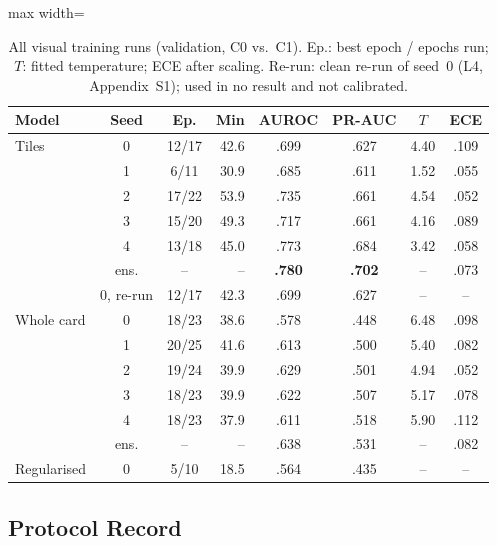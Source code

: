 \documentclass[12pt]{article}
\begin{document}
\begin{table}[H]
\caption{All visual training runs (validation, C0 vs.\ C1). Ep.: best
epoch / epochs run; $T$: fitted temperature; ECE after scaling.
Re-run: clean re-run of seed~0 (L4, Appendix~S1); used in no
result and not calibrated.}
\label{tab:runs}
\centering
\scriptsize
\setlength{\tabcolsep}{2.6pt}
\renewcommand{\arraystretch}{1.08}
\begin{adjustbox}{max width=\linewidth}
\begin{tabular}{@{}l c c r c c c c@{}}
\toprule
Model & Seed & Ep. & Min & AUROC & PR-AUC & $T$ & ECE \\
\midrule
Tiles & 0 & 12/17 & 42.6 & .699 & .627 & 4.40 & .109 \\
      & 1 & \hphantom{0}6/11 & 30.9 & .685 & .611 & 1.52 & .055 \\
      & 2 & 17/22 & 53.9 & .735 & .661 & 4.54 & .052 \\
      & 3 & 15/20 & 49.3 & .717 & .661 & 4.16 & .089 \\
      & 4 & 13/18 & 45.0 & .773 & .684 & 3.42 & .058 \\
      & ens. & -- & -- & \textbf{.780} & \textbf{.702} & -- & .073 \\
      & 0, re-run & 12/17 & 42.3 & .699 & .627 & -- & -- \\
\addlinespace[4pt]
Whole card & 0 & 18/23 & 38.6 & .578 & .448 & 6.48 & .098 \\
           & 1 & 20/25 & 41.6 & .613 & .500 & 5.40 & .082 \\
           & 2 & 19/24 & 39.9 & .629 & .501 & 4.94 & .052 \\
           & 3 & 18/23 & 39.9 & .622 & .507 & 5.17 & .078 \\
           & 4 & 18/23 & 37.9 & .611 & .518 & 5.90 & .112 \\
           & ens. & -- & -- & .638 & .531 & -- & .082 \\
\addlinespace[4pt]
Regularised & 0 & \hphantom{0}5/10 & 18.5 & .564 & .435 & -- & -- \\
\bottomrule
\end{tabular}
\end{adjustbox}
\end{table}

\subsection*{Protocol Record}
\end{document}
